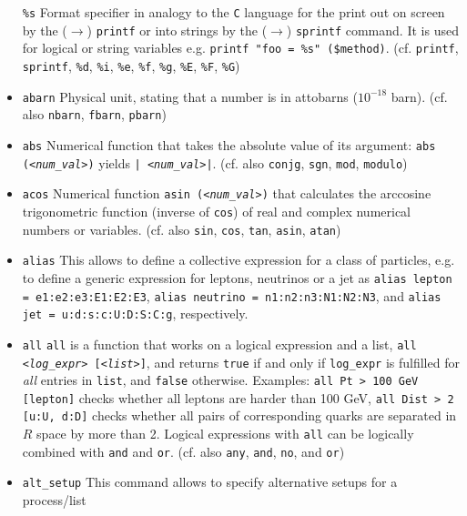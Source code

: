 \documentclass[12pt]{book}
\newcommand{\ttt}[1]{\texttt{#1}}
\begin{document}
\begin{itemize}
\ttt{\%s} \newline
Format specifier in analogy to the \ttt{C} language for the print out
on screen by the ($\to$) \ttt{printf} or into strings by the ($\to$)
\ttt{sprintf} command. It is used for logical or string variables
e.g. \ttt{printf "foo = \%s" (\$method)}. (cf. \ttt{printf}, \ttt{sprintf},
\ttt{\%d}, \ttt{\%i}, \ttt{\%e}, \ttt{\%f}, \ttt{\%g}, \ttt{\%E}, \ttt{\%F},
\ttt{\%G})
\item
\ttt{abarn} \newline
Physical unit, stating that a number is in attobarns ($10^{-18}$
barn). (cf. also \ttt{nbarn}, \ttt{fbarn}, \ttt{pbarn})
\item
\ttt{abs} \newline
Numerical function that takes the absolute value of its argument:
\ttt{abs ({\em <num\_val>})} yields \ttt{|{\em
<num\_val>}|}. (cf. also \ttt{conjg}, \ttt{sgn}, \ttt{mod}, \ttt{modulo})
\item
\ttt{acos} \newline
Numerical function \ttt{asin ({\em <num\_val>})} that calculates the
arccosine trigonometric function (inverse of \ttt{cos}) of real and
complex numerical numbers or variables. (cf. also \ttt{sin},
\ttt{cos}, \ttt{tan}, \ttt{asin}, \ttt{atan})
\item
\ttt{alias} \newline
This allows to define a collective expression for a class of
particles, e.g. to define a generic expression for leptons, neutrinos
or a jet as \ttt{alias lepton = e1:e2:e3:E1:E2:E3}, \ttt{alias
neutrino = n1:n2:n3:N1:N2:N3}, and \ttt{alias jet =
u:d:s:c:U:D:S:C:g}, respectively.
\item
\ttt{all} \newline
\ttt{all} is a function that works on a logical expression and a list,
\ttt{all {\em <log\_expr>} [{\em <list>}]}, and returns \ttt{true} if and only if
\ttt{log\_expr} is fulfilled for {\em all} entries in \ttt{list}, and
\ttt{false} otherwise. Examples: \ttt{all Pt > 100 GeV [lepton]}
checks whether all leptons are harder than 100 GeV, \ttt{all Dist > 2
  [u:U, d:D]} checks whether all pairs of corresponding quarks
are separated in $R$ space by more than 2. Logical expressions with
\ttt{all} can be logically combined with \ttt{and} and
\ttt{or}. (cf. also \ttt{any}, \ttt{and}, \ttt{no}, and \ttt{or})
\item
\ttt{alt\_setup} \newline
This command allows to specify alternative setups for a process/list

\end{itemize}
\end{document}
